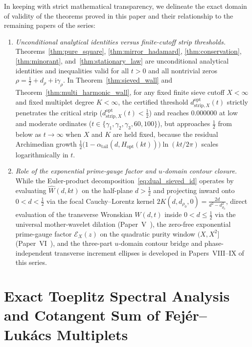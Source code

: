 \documentclass[11pt,reqno]{amsart}
\theoremstyle{definition}
\theoremstyle{remark}
\numberwithin{equation}{section}
\newcommand{\ii}{\mathrm{i}}
\begin{document}
In keeping with strict mathematical transparency, we delineate the exact domain of validity of the theorems proved in this paper and their relationship to the remaining papers of the series:
\begin{enumerate}[label=\textup{(\arabic*)},leftmargin=2.2em]
\item \textit{Unconditional analytical identities versus finite-cutoff strip thresholds.} Theorems~\ref{thm:pure_square}, \ref{thm:mirror_hadamard}, \ref{thm:conservation}, \ref{thm:minorant}, and~\ref{thm:stationary_law} are unconditional analytical identities and inequalities valid for all $t > 0$ and all nontrivial zeros $\rho = \frac{1}{2} + d_\rho + \ii\gamma_\rho$. In Theorem~\ref{thm:sieved_wall} and Theorem~\ref{thm:multi_harmonic_wall}, for any fixed finite sieve cutoff $X < \infty$ and fixed multiplet degree $K < \infty$, the certified threshold $d_{\mathrm{strip},X}^{\mathrm{opt}}(t)$ strictly penetrates the critical strip ($d_{\mathrm{strip},X}^{\mathrm{opt}}(t) < \frac{1}{2}$) and reaches $0.000000$ at low and moderate ordinates ($t \in \{\gamma_1, \gamma_2, \gamma_3, 60, 100\}$), but approaches $\frac{1}{2}$ from below as $t \to \infty$ when $X$ and $K$ are held fixed, because the residual Archimedian growth $\frac{1}{2}\bigl(1 - \alpha_{\mathrm{tail}}(d, H_{\mathrm{opt}}(kt))\bigr)\ln(kt/2\pi)$ scales logarithmically in $t$.
\item \textit{Role of the exponential prime-gauge factor and $u$-domain contour closure.} While the Euler-product decomposition~\eqref{eq:dual_sieved_id} operates by evaluating $\widehat{W}(d,kt)$ on the half-plane $d > \frac{1}{2}$ and projecting inward onto $0 < d < \frac{1}{2}$ via the focal Cauchy--Lorentz kernel $2K(d, d_{\rho_0}, 0) = \frac{2d}{d^2 - d_{\rho_0}^2}$, direct evaluation of the transverse Wronskian $W(d,t)$ inside $0 < d \le \frac{1}{2}$ via the universal mother-wavelet dilation (Paper~V~\cite{missiaen2026paper5}), the zero-free exponential prime-gauge factor $\mathcal{E}_X(z)$ on the quadratic purity window $(X, X^2]$ (Paper~VI~\cite{missiaen2026paper6}), and the three-part $u$-domain contour bridge and phase-independent transverse increment ellipses is developed in Papers~VIII--IX of this series.
\end{enumerate}

\appendix

\section{Exact Toeplitz Spectral Analysis and Cotangent Sum of Fej\'er--Luk\'acs Multiplets}\label{app:fejer}
\end{document}
